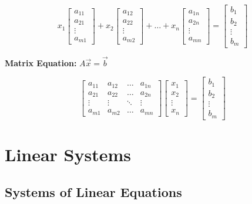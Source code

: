 \documentclass[
  letterpaper,
  DIV=11,
  numbers=noendperiod]{scrreprt}
\begin{document}
\[
x_1
\begin{bmatrix}
a_{11}\\
a_{21}\\
\vdots\\
a_{m1}
\end{bmatrix} +
x_2
\begin{bmatrix}
a_{12}\\
a_{22}\\
\vdots\\
a_{m2}
\end{bmatrix}+
\dots +
x_n
\begin{bmatrix}
a_{1n}\\
a_{2n}\\
\vdots\\
a_{mn}
\end{bmatrix} = 
\begin{bmatrix}
b_1\\
b_2\\
\vdots\\
b_m
\end{bmatrix}
\]

\textbf{Matrix Equation:} \(A\vec{x}=\vec{b}\)

\[
\begin{bmatrix}
a_{11} & a_{12} & \dots & a_{1n} \\
a_{21} & a_{22} & \dots & a_{2n} \\
\vdots & \vdots & \ddots & \vdots \\
a_{m1} & a_{m2} & \dots & a_{mn}
\end{bmatrix} 
\begin{bmatrix}
x_1 \\ 
x_2 \\ 
\vdots \\ 
x_n
\end{bmatrix}=
\begin{bmatrix}
b_1 \\ b_2 \\ \vdots \\ b_m
\end{bmatrix}
\]


\hypertarget{linear-systems}{%
\chapter{Linear Systems}\label{linear-systems}}

\hypertarget{systems-of-linear-equations}{%
\section*{Systems of Linear
Equations}\label{systems-of-linear-equations}}
\end{document}
